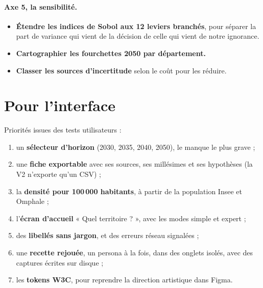 \paragraph{Axe 5, la sensibilité.}
\begin{itemize}
  \item \textbf{Étendre les indices de Sobol aux 12 leviers branchés}, pour séparer la part de
        variance qui vient de la décision de celle qui vient de notre ignorance.
  \item \textbf{Cartographier les fourchettes 2050 par département.}
  \item \textbf{Classer les sources d'incertitude} selon le coût pour les réduire.
\end{itemize}

\section{Pour l'interface}
Priorités issues des tests utilisateurs :
\begin{enumerate}
  \item un \textbf{sélecteur d'horizon} (2030, 2035, 2040, 2050), le manque le plus grave ;
  \item une \textbf{fiche exportable} avec ses sources, ses millésimes et ses hypothèses (la V2
        n'exporte qu'un CSV) ;
  \item la \textbf{densité pour 100\,000 habitants}, à partir de la population Insee et
        Omphale ;
  \item l'\textbf{écran d'accueil} « Quel territoire ? », avec les modes simple et expert ;
  \item des \textbf{libellés sans jargon}, et des erreurs réseau signalées ;
  \item une \textbf{recette rejouée}, un persona à la fois, dans des onglets isolés, avec des
        captures écrites sur disque ;
  \item les \textbf{tokens W3C}, pour reprendre la direction artistique dans Figma.
\end{enumerate}

